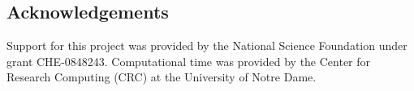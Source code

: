 \documentclass[11pt]{article}
\begin{document}
\begin{doublespace}
\section{Acknowledgements}
  Support for this project was provided by the National Science
  Foundation under grant CHE-0848243. Computational time was provided
  by the Center for Research Computing (CRC) at the University of
  Notre Dame.

\newpage


\end{doublespace}

\end{document}
